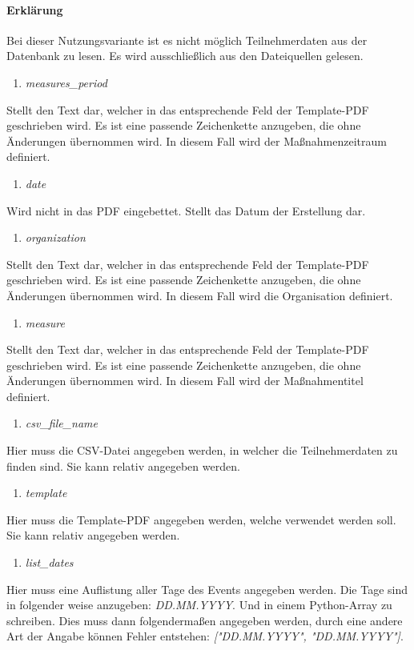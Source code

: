 \documentclass[12pt,parskip=full, pagea4]{scrreprt}
\begin{document}
			\paragraph{Erkl\"arung}\leftskip=0cm Bei dieser Nutzungsvariante ist es nicht möglich Teilnehmerdaten aus der Datenbank zu lesen. Es wird ausschließlich aus den Dateiquellen gelesen.
			\begin{enumerate}[resume]
				\item \textit{measures\_period}
			\end{enumerate}
			\leftskip=1.5cm	Stellt den Text dar, welcher in das entsprechende Feld der Template-PDF geschrieben wird. Es ist eine passende Zeichenkette anzugeben, die ohne \"Anderungen \"ubernommen wird. In diesem Fall wird der Maßnahmenzeitraum definiert.
			\begin{enumerate}[resume]
				\item \textit{date}
			\end{enumerate}
			\leftskip=1.5cm	Wird nicht in das PDF eingebettet. Stellt das Datum der Erstellung dar.
			\begin{enumerate}[resume]
				\item \textit{organization}
			\end{enumerate}
			\leftskip=1.5cm	Stellt den Text dar, welcher in das entsprechende Feld der Template-PDF geschrieben wird. Es ist eine passende Zeichenkette anzugeben, die ohne \"Anderungen \"ubernommen wird. In diesem Fall wird die Organisation definiert.
			\begin{enumerate}[resume]
				\item \textit{measure}
			\end{enumerate}
			\leftskip=1.5cm	Stellt den Text dar, welcher in das entsprechende Feld der Template-PDF geschrieben wird. Es ist eine passende Zeichenkette anzugeben, die ohne \"Anderungen \"ubernommen wird. In diesem Fall wird der Maßnahmentitel definiert.
			\begin{enumerate}[resume]
				\item \textit{csv\_file\_name}
			\end{enumerate}
			\leftskip=1.5cm	Hier muss die CSV-Datei angegeben werden, in welcher die Teilnehmerdaten zu finden sind. Sie kann relativ angegeben werden.
			\begin{enumerate}[resume]
				\item \textit{template}
			\end{enumerate}
			\leftskip=1.5cm	Hier muss die Template-PDF angegeben werden, welche verwendet werden soll. Sie kann relativ angegeben werden.
			\begin{enumerate}[resume]
				\item \textit{list\_dates}
			\end{enumerate}
			\leftskip=1.5cm	Hier muss eine Auflistung aller Tage des Events angegeben werden. Die Tage sind in folgender weise anzugeben: \textit{DD.MM.YYYY}. Und in einem Python-Array zu schreiben. Dies muss dann folgendermaßen angegeben werden, durch eine andere Art der Angabe können Fehler entstehen: \textit{["DD.MM.YYYY", "DD.MM.YYYY"]}.
\end{document}
